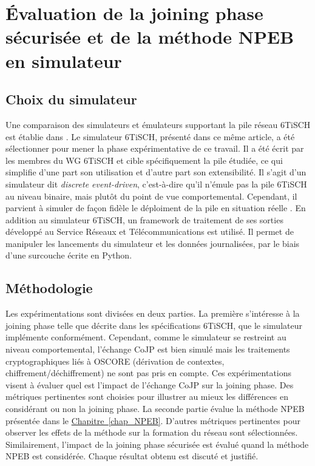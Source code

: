\documentclass[]{report}
\newcommand{\wordlink}[2]{\hyperref[#2]{#1~\ref{#2}}}
\begin{document}
\chapter{Évaluation de la joining phase sécurisée et de la méthode NPEB en simulateur}
\label{chap_exp}
\newpage

\section{Choix du simulateur}
\label{choice_sim}

Une comparaison des simulateurs et émulateurs supportant la pile réseau 6TiSCH est établie dans \cite{simulating-6TiSCH}. Le simulateur 6TiSCH, présenté dans ce même article, a été sélectionner pour mener la phase expérimentative de ce travail. Il a été écrit par les membres du WG 6TiSCH et cible spécifiquement la pile étudiée, ce qui simplifie d'une part son utilisation et d'autre part son extensibilité. Il s'agit d'un simulateur dit \textit{discrete event-driven}, c'est-à-dire qu'il n'émule pas la pile 6TiSCH au niveau binaire, mais plutôt du point de vue comportemental. Cependant, il parvient à simuler de façon fidèle le déploiment de la pile en situation réelle \cite{simulating-6TiSCH}. En addition au simulateur 6TiSCH, un framework de traitement de ses sorties développé au Service Réseaux et Télécommunications est utilisé. Il permet de manipuler les lancements du simulateur et les données journalisées, par le biais d'une surcouche écrite en Python.

\section{Méthodologie}

Les expérimentations sont divisées en deux parties. La première s'intéresse à la joining phase telle que décrite dans les spécifications 6TiSCH, que le simulateur implémente conformément. Cependant, comme le simulateur se restreint au niveau comportemental, l'échange CoJP est bien simulé mais les traitements cryptographiques liés à OSCORE (dérivation de contextes, chiffrement/déchiffrement) ne sont pas pris en compte. Ces expérimentations visent à évaluer quel est l'impact de l'échange CoJP sur la joining phase. Des métriques pertinentes sont choisies pour illustrer au mieux les différences en considérant ou non la joining phase. La seconde partie évalue la méthode NPEB présentée dans le \wordlink{Chapitre}{chap_NPEB}. D'autres métriques pertinentes pour observer les effets de la méthode sur la formation du réseau sont sélectionnées. Similairement, l'impact de la joining phase sécurisée est évalué quand la méthode NPEB est considérée. Chaque résultat obtenu est discuté et justifié.\\
\end{document}
